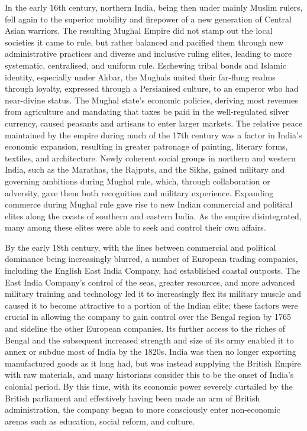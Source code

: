 In the early 16th century, northern India, being then under mainly
Muslim rulers, fell again to the superior mobility and firepower of a
new generation of Central Asian warriors. The resulting Mughal Empire
did not stamp out the local societies it came to rule, but rather
balanced and pacified them through new administrative practices and
diverse and inclusive ruling elites, leading to more systematic,
centralised, and uniform rule. Eschewing tribal bonds and Islamic
identity, especially under Akbar, the Mughals united their far-flung
realms through loyalty, expressed through a Persianised culture, to an
emperor who had near-divine status. The Mughal state's economic
policies, deriving most revenues from agriculture and mandating that
taxes be paid in the well-regulated silver currency, caused peasants and
artisans to enter larger markets. The relative peace maintained by the
empire during much of the 17th century was a factor in India's economic
expansion, resulting in greater patronage of painting, literary forms,
textiles, and architecture. Newly coherent social groups in northern and
western India, such as the Marathas, the Rajputs, and the Sikhs, gained
military and governing ambitions during Mughal rule, which, through
collaboration or adversity, gave them both recognition and military
experience. Expanding commerce during Mughal rule gave rise to new
Indian commercial and political elites along the coasts of southern and
eastern India. As the empire disintegrated, many among these elites were
able to seek and control their own affairs.

By the early 18th century, with the lines between commercial and
political dominance being increasingly blurred, a number of European
trading companies, including the English East India Company, had
established coastal outposts. The East India Company's control of the
seas, greater resources, and more advanced military training and
technology led it to increasingly flex its military muscle and caused it
to become attractive to a portion of the Indian elite; these factors
were crucial in allowing the company to gain control over the Bengal
region by 1765 and sideline the other European companies. Its further
access to the riches of Bengal and the subsequent increased strength and
size of its army enabled it to annex or subdue most of India by the
1820s. India was then no longer exporting manufactured goods as it long
had, but was instead supplying the British Empire with raw materials,
and many historians consider this to be the onset of India's colonial
period. By this time, with its economic power severely curtailed by the
British parliament and effectively having been made an arm of British
administration, the company began to more consciously enter non-economic
arenas such as education, social reform, and culture.

